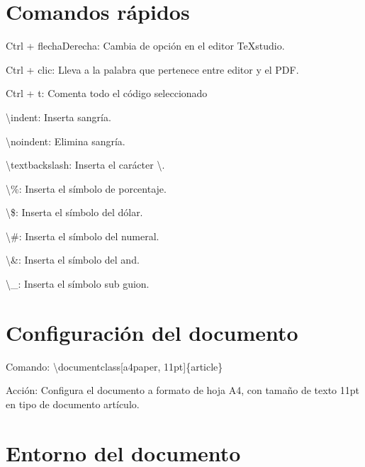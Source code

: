 \documentclass[a4paper, 12pt]{article}
\begin{document}
	\begin{flushleft} \color{colorGris2}
		
		\section{Comandos rápidos}
		
		Ctrl + flechaDerecha: Cambia de opción en el editor TeXstudio.\newline
		
		Ctrl + clic: Lleva a la palabra que pertenece entre editor y el PDF.\newline
		
		Ctrl + t: Comenta todo el código seleccionado
		
		\textbackslash indent: Inserta sangría.\newline
		
		\textbackslash noindent: Elimina sangría.\newline
		
		\textbackslash textbackslash: Inserta el carácter \textbackslash.\newline
		
		\textbackslash \%: Inserta el símbolo de porcentaje.\newline
		
		\textbackslash \$: Inserta el símbolo del dólar.\newline
		
		\textbackslash \#: Inserta el símbolo del numeral.\newline
		
		\textbackslash \&: Inserta el símbolo del and.\newline
		
		\textbackslash \_: Inserta el símbolo sub guion.\newline
		
		\section{Configuración del documento}
		
		Comando: \textbackslash documentclass[a4paper, 11pt]\{article\}\newline
			
		Acción: Configura el documento  a formato de hoja A4, con tamaño de texto 11pt en tipo de documento artículo.\newline
			
		\section{Entorno del documento}
			

\end{flushleft}
\end{document}

